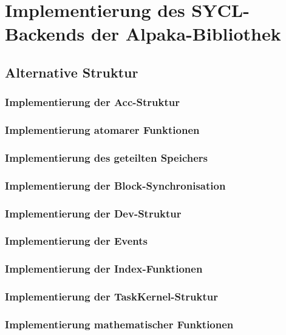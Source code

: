 \chapter{Implementierung des SYCL-Backends der Alpaka-Bibliothek}
\label{implementierung}

\section{Alternative Struktur}

\subsection{Implementierung der Acc-Struktur}

\subsection{Implementierung atomarer Funktionen}

\subsection{Implementierung des geteilten Speichers}

\subsection{Implementierung der Block-Synchronisation}

\subsection{Implementierung der Dev-Struktur}

\subsection{Implementierung der Events}

\subsection{Implementierung der Index-Funktionen}

\subsection{Implementierung der TaskKernel-Struktur}

\subsection{Implementierung mathematischer Funktionen}

